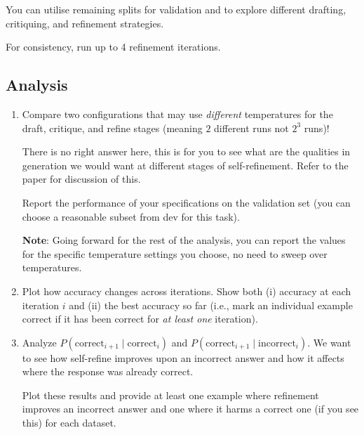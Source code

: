 \documentclass{article}
\begin{document}
You can utilise remaining splits for validation and to explore different drafting, critiquing, and refinement strategies.

For consistency, run up to 4 refinement iterations.


\subsection{Analysis}

\begin{enumerate}
    \item  Compare two configurations that may use \emph{different} temperatures for the draft, critique, and refine stages (meaning $2$ different runs not $2^3$ runs)!
    
    There is no right answer here, this is for you to see what are the qualities in generation we would want at different stages of self-refinement. Refer to the paper for discussion of this.
    
    Report the performance of your specifications on the validation set (you can choose a reasonable subset from dev for this task).

    \textbf{Note}: Going forward for the rest of the analysis, you can report the values for the specific temperature settings you choose, no need to sweep over temperatures.
    \begin{solve}
    
    \end{solve}
    \item Plot how accuracy changes across iterations. Show both (i) accuracy at each iteration $i$ and (ii) the best accuracy so far (i.e., mark an individual example correct if it has been correct for \textit{at least one} iteration).  
    \begin{solve}
    
    \end{solve}
    \item Analyze $P(\text{correct}_{i+1} \mid \text{correct}_{i})$ and $P(\text{correct}_{i+1} \mid \text{incorrect}_{i})$.  We want to see how self-refine improves upon an incorrect answer and how it affects where the response was already correct.

    
    Plot these results and provide at least one example where refinement improves an incorrect answer and one where it harms a correct one (if you see this) for each dataset.
    \begin{solve}
    

\end{solve}
\end{enumerate}
\end{document}
